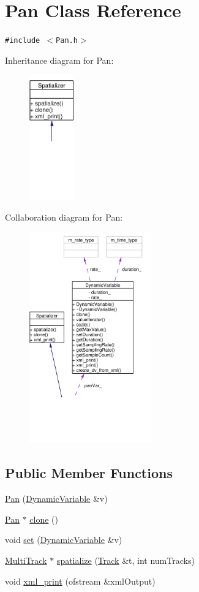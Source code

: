 \hypertarget{classPan}{
\section{Pan Class Reference}
\label{classPan}
}
{\tt \#include $<$Pan.h$>$}

Inheritance diagram for Pan:\begin{figure}[H]
\begin{center}
\leavevmode
\includegraphics[width=55pt]{classPan__inherit__graph}
\end{center}
\end{figure}
Collaboration diagram for Pan:\begin{figure}[H]
\begin{center}
\leavevmode
\includegraphics[width=149pt]{classPan__coll__graph}
\end{center}
\end{figure}
\subsection*{Public Member Functions}
\begin{CompactItemize}
\item 
\hyperlink{classPan_a0}{Pan} (\hyperlink{classDynamicVariable}{Dynamic\-Variable} \&v)
\item 
\hyperlink{classPan}{Pan} $\ast$ \hyperlink{classPan_a1}{clone} ()
\item 
void \hyperlink{classPan_a2}{set} (\hyperlink{classDynamicVariable}{Dynamic\-Variable} \&v)
\item 
\hyperlink{classMultiTrack}{Multi\-Track} $\ast$ \hyperlink{classPan_a3}{spatialize} (\hyperlink{classTrack}{Track} \&t, int num\-Tracks)
\item 
void \hyperlink{classPan_a4}{xml\_\-print} (ofstream \&xml\-Output)
\end{CompactItemize}
